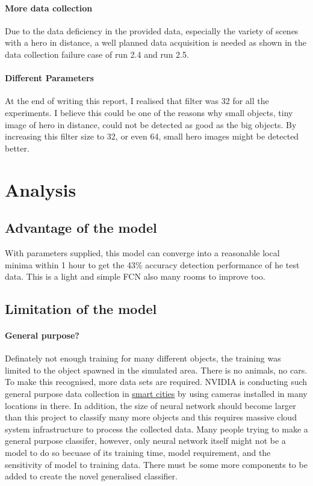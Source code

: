 \documentclass[paper=a4, fontsize=11pt]{scrartcl} %
\numberwithin{equation}{section} %
\numberwithin{figure}{section} %
\numberwithin{table}{section} %
\begin{document}
\begin{enumerate}
\begin{itemize}
{\paragraph{More data collection}
Due to the data deficiency in the provided data, especially the variety of scenes with a hero in distance, a well planned data acquisition is needed as shown in the data collection failure case of run 2.4 and run 2.5. 
\paragraph{Different Parameters}
At the end of writing this report, I realised that filter was 32 for all the experiments. I believe this could be one of the reasons why small objects, tiny image of hero in distance, could not be detected as good as the big objects. By increasing this filter size to 32, or even 64, small hero images might be detected better.
\pagebreak
\section{Analysis}
\subsection{Advantage of the model}
With parameters supplied, this model can converge into a reasonable local minima within 1 hour to get the 43\% accuracy detection performance of he test data. This is a light and simple FCN also many rooms to improve too.

\subsection{Limitation of the model}\label{rubric50}
\paragraph{General purpose?}
Definately not enough training for many different objects, the training was limited to the object spawned in the simulated area. There is no animals, no cars. To make this recognised, more data sets are required. NVIDIA is conducting such general purpose data collection in \href{https://www.nvidia.com/en-us/deep-learning-ai/industries/ai-cities/}{smart cities} by using cameras installed in many locations in there. In addition, the size of neural network should become larger than this project to classify many more objects and this requires massive cloud system infrastructure to process the collected data.
Many people trying to make a general purpose classifer, however, only neural network itself might not be a model to do so becuase of its training time, model requirement, and the sensitivity of model to training data. There must be some more components to be added to create the novel generalised classifier.
}
\end{itemize}
\end{enumerate}
\end{document}
